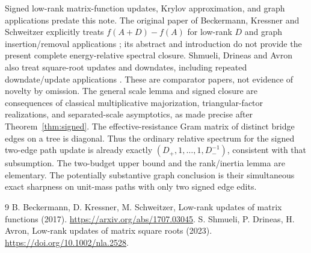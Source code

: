 \documentclass[11pt]{article}
\begin{document}
Signed low-rank matrix-function updates, Krylov approximation, and graph
applications predate this note. The original paper of Beckermann,
Kressner and Schweitzer explicitly treats $f(A+D)-f(A)$ for low-rank
$D$ and graph insertion/removal applications
\cite{BKS}; its abstract and introduction do not provide the present
complete energy-relative spectral closure. Shmueli, Drineas and Avron
also treat square-root updates and downdates, including repeated
downdate/update applications \cite{SDA}. These are comparator papers,
not evidence of novelty by omission. The general scale lemma and signed
closure are consequences of classical multiplicative majorization,
triangular-factor realizations, and separated-scale asymptotics, as made
precise after Theorem~\ref{thm:signed}. The effective-resistance Gram
matrix of distinct bridge edges on a tree is diagonal. Thus the ordinary
relative spectrum for the signed two-edge path update is already exactly
$(D_+,1,\ldots,1,D_-^{-1})$, consistent with that subsumption.
The two-budget upper bound and the rank/inertia lemma are elementary.
The potentially substantive graph conclusion is their simultaneous exact
sharpness on unit-mass paths with only two signed edge edits.

\begin{thebibliography}{9}
 B. Beckermann, D. Kressner, M. Schweitzer,
Low-rank updates of matrix functions (2017).
\url{https://arxiv.org/abs/1707.03045}.
 S. Shmueli, P. Drineas, H. Avron,
Low-rank updates of matrix square roots (2023).
\url{https://doi.org/10.1002/nla.2528}.
\end{thebibliography}
\end{document}
